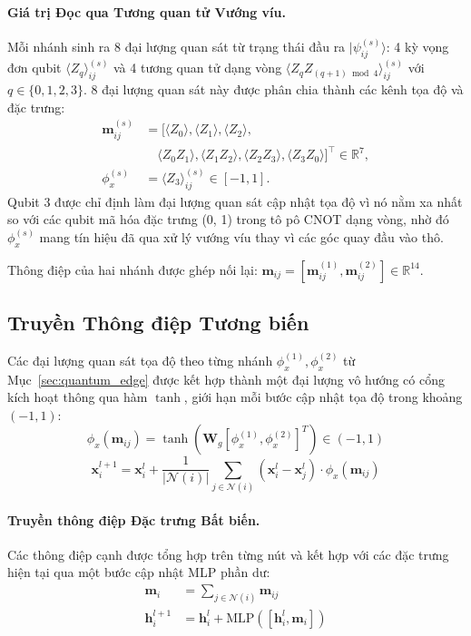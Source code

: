 \documentclass[10pt,twocolumn,letterpaper]{article}
\begin{document}
\paragraph{Giá trị Đọc qua Tương quan tử Vướng víu.}
Mỗi nhánh sinh ra 8 đại lượng quan sát từ trạng thái đầu ra $|\psi_{ij}^{(s)}\rangle$: 4 kỳ vọng đơn qubit $\langle Z_q \rangle_{ij}^{(s)}$ và 4 tương quan tử dạng vòng $\langle Z_q Z_{(q+1)\bmod 4} \rangle_{ij}^{(s)}$ với $q \in \{0, 1, 2, 3\}$. 8 đại lượng quan sát này được phân chia thành các kênh tọa độ và đặc trưng:
\begin{align}
    \mathbf{m}_{ij}^{(s)} &= \big[\langle Z_0 \rangle, \langle Z_1 \rangle, \langle Z_2 \rangle, \nonumber \\
    &\quad \langle Z_0 Z_1 \rangle, \langle Z_1 Z_2 \rangle, \langle Z_2 Z_3 \rangle, \langle Z_3 Z_0 \rangle\big]^\top \in \mathbb{R}^7, \\
    \phi_x^{(s)} &= \langle Z_3 \rangle_{ij}^{(s)} \in [-1, 1].
\end{align}
Qubit 3 được chỉ định làm đại lượng quan sát cập nhật tọa độ vì nó nằm xa nhất so với các qubit mã hóa đặc trưng (0, 1) trong tô pô CNOT dạng vòng, nhờ đó $\phi_x^{(s)}$ mang tín hiệu đã qua xử lý vướng víu thay vì các góc quay đầu vào thô.

Thông điệp của hai nhánh được ghép nối lại: $\mathbf{m}_{ij} = [\mathbf{m}_{ij}^{(1)}, \mathbf{m}_{ij}^{(2)}] \in \mathbb{R}^{14}$.

\subsection{Truyền Thông điệp Tương biến}
\label{sec:message_passing}

Các đại lượng quan sát tọa độ theo từng nhánh $\phi_x^{(1)}, \phi_x^{(2)}$ từ Mục~\ref{sec:quantum_edge} được kết hợp thành một đại lượng vô hướng có cổng kích hoạt thông qua hàm $\tanh$, giới hạn mỗi bước cập nhật tọa độ trong khoảng $(-1, 1)$:
\begin{equation}
    \phi_x(\mathbf{m}_{ij}) = \tanh\!\left(\mathbf{W}_g \left[\phi_x^{(1)}, \phi_x^{(2)}\right]^T\right) \in (-1, 1)
\end{equation}
\begin{equation}
    \mathbf{x}_i^{l+1} = \mathbf{x}_i^l + \frac{1}{|\mathcal{N}(i)|} \sum_{j \in \mathcal{N}(i)} (\mathbf{x}_i^l - \mathbf{x}_j^l) \cdot \phi_x(\mathbf{m}_{ij})
    \label{eq:coord_update}
\end{equation}

\paragraph{Truyền thông điệp Đặc trưng Bất biến.}
Các thông điệp cạnh được tổng hợp trên từng nút và kết hợp với các đặc trưng hiện tại qua một bước cập nhật MLP phần dư:
\begin{align}
    \mathbf{m}_i &= \sum_{j \in \mathcal{N}(i)} \mathbf{m}_{ij} \\
    \mathbf{h}_i^{l+1} &= \mathbf{h}_i^l + \mathrm{MLP}\left([\mathbf{h}_i^l, \mathbf{m}_i]\right)
    \label{eq:feat_update}
\end{align}
\end{document}
